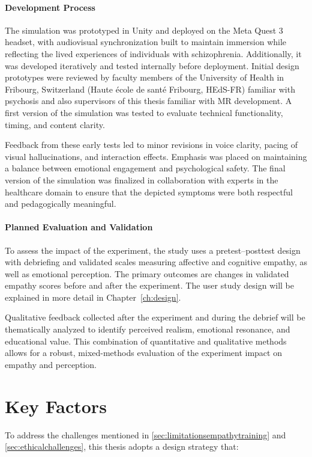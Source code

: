 \paragraph{Development Process}

The simulation was prototyped in Unity and deployed on the Meta Quest 3 headset, with audiovisual synchronization built to maintain immersion while reflecting the lived experiences of individuals with schizophrenia. Additionally, it was developed iteratively and tested internally before deployment. Initial design prototypes were reviewed by faculty members of the University of Health in Fribourg, Switzerland (Haute école de santé Fribourg, HEdS-FR) familiar with psychosis and also supervisors of this thesis familiar with MR development. A first version of the simulation was tested to evaluate technical functionality, timing, and content clarity.

\vspace{1em}

Feedback from these early tests led to minor revisions in voice clarity, pacing of visual hallucinations, and interaction effects. Emphasis was placed on maintaining a balance between emotional engagement and psychological safety. The final version of the simulation was finalized in collaboration with experts in the healthcare domain to ensure that the depicted symptoms were both respectful and pedagogically meaningful.

\paragraph{Planned Evaluation and Validation}

To assess the impact of the experiment, the study uses a pretest–posttest design with debriefing and validated scales measuring affective and cognitive empathy, as well as emotional perception. The primary outcomes are changes in validated empathy scores before and after the experiment. The user study design will be explained in more detail in Chapter~\ref{ch:design}.

Qualitative feedback collected after the experiment and during the debrief will be thematically analyzed to identify perceived realism, emotional resonance, and educational value. This combination of quantitative and qualitative methods allows for a robust, mixed-methods evaluation of the experiment impact on empathy and perception.


\section{Key Factors}
To address the challenges mentioned in \ref{sec:limitationsempathytraining} and \ref{sec:ethicalchallenges}, this thesis adopts a design strategy that:

